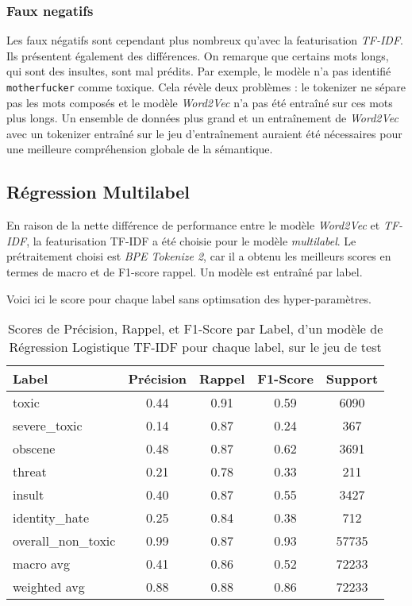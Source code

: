 \subsubsection{Faux negatifs}
Les faux négatifs sont cependant plus nombreux qu'avec la featurisation \textit{TF-IDF}. 
Ils présentent également des différences. On remarque que certains mots longs, qui sont des insultes, sont mal prédits. 
Par exemple, le modèle n'a pas identifié \texttt{motherfucker} comme toxique. 
Cela révèle deux problèmes : le tokenizer ne sépare pas les mots composés et le modèle \textit{Word2Vec} n'a pas été entraîné sur ces mots plus longs. 
Un ensemble de données plus grand et un entraînement de \textit{Word2Vec} avec un tokenizer entraîné sur le jeu d'entraînement auraient été nécessaires pour une meilleure compréhension globale de la sémantique.

\subsection{Régression Multilabel}
En raison de la nette différence de performance entre le modèle \textit{Word2Vec} et \textit{TF-IDF}, la featurisation TF-IDF a été choisie pour le modèle \textit{multilabel}. 
Le prétraitement choisi est \textit{BPE Tokenize 2}, car il a obtenu les meilleurs scores en termes de macro et de F1-score rappel. 
Un modèle est entraîné par label.

Voici ici le score pour chaque label sans optimsation des hyper-paramètres.
\begin{table}[ht]
    \centering
    \caption{Scores de Précision, Rappel, et F1-Score par Label, d'un modèle de Régression Logistique TF-IDF pour chaque label, sur le jeu de test}
    \begin{tabular}{lcccc}
    \hline
    \textbf{Label} & \textbf{Précision} & \textbf{Rappel} & \textbf{F1-Score} & \textbf{Support} \\ \hline
    toxic          & 0.44               & 0.91            & 0.59              & 6090             \\
    severe\_toxic  & 0.14               & 0.87            & 0.24              & 367              \\
    obscene        & 0.48               & 0.87            & 0.62              & 3691             \\
    threat         & 0.21               & 0.78            & 0.33              & 211              \\
    insult         & 0.40               & 0.87            & 0.55              & 3427             \\
    identity\_hate & 0.25               & 0.84            & 0.38              & 712              \\
    overall\_non\_toxic & 0.99           & 0.87            & 0.93              & 57735            \\\hline
    macro avg      & 0.41               & 0.86            & 0.52              & 72233            \\
    weighted avg   & 0.88               & 0.88            & 0.86              & 72233            \\
    \end{tabular}
    \label{tab:scores}
\end{table}
